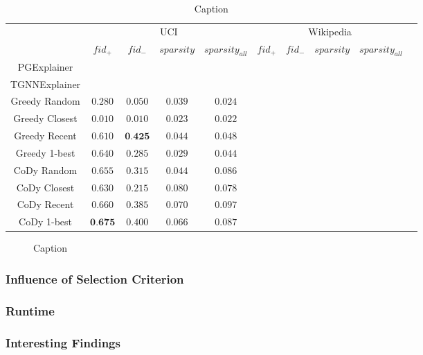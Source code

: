 \begin{table}
    \centering
    \begin{tabular}{cccccccccc}
    \hline
         &  \multicolumn{4}{c}{UCI}&  \multicolumn{4}{c}{Wikipedia}& \\
         &  $fid_+$&  $fid_-$&  $sparsity$&  $sparsity_{all}$&  $fid_+$&  $fid_-$&  $sparsity$&  $sparsity_{all}$& \\
         \hline
         PGExplainer&  &  &  &  &  &  &  &  & \\
         TGNNExplainer&  &  &  &  &  &  &  &  & \\
         Greedy Random&  $0.280$&  $0.050$&  $0.039$& $ 0.024$&  &  &  &  & \\
         Greedy Closest&  $0.010$&  $0.010$&  $0.023$&  $0.022$&  &  &  &  & \\
         Greedy Recent&  $0.610$&  $\textbf{0.425}$&  $0.044$&  $0.048$&  &  &  &  & \\
 Greedy 1-best& $0.640$& $0.285$& $0.029$& $0.044$& & & & &\\
 CoDy Random& $0.655$& $0.315$& $0.044$& $0.086$& & & & &\\
 CoDy Closest& $0.630$& $0.215$& $0.080$& $0.078$& & & & &\\
 CoDy Recent& \underline{$0.660$}& $0.385$& $0.070$& $0.097$& & & & &\\
 CoDy 1-best& $\textbf{0.675}$& \underline{$0.400$}& $0.066$& $0.087$& & & & &\\
 \hline
    \end{tabular}
    \caption{Caption}
    \label{tab:my_label}
\end{table}


\begin{figure}
    \centering
    
    \caption{Caption}
    \label{fig:enter-label}
\end{figure}


\subsubsection{Influence of Selection Criterion}
\label{s_Evaluation_Results_CriterionInfluence}

\subsubsection{Runtime}
\label{s_Evaluation_Results_Runtime}

\subsubsection{Interesting Findings} %




